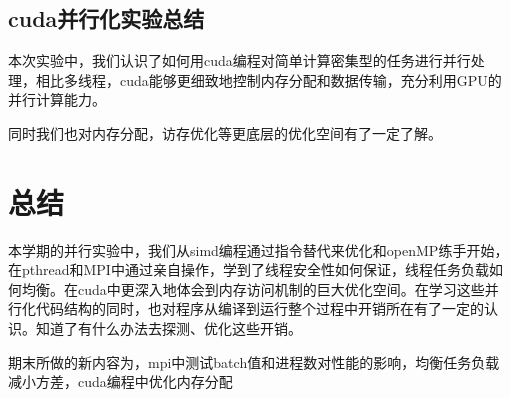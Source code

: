 \documentclass[a4paper]{article}
\begin{document}
\subsection{cuda并行化实验总结}
\par 本次实验中，我们认识了如何用cuda编程对简单计算密集型的任务进行并行处理，相比多线程，cuda能够更细致地控制内存分配和数据传输，充分利用GPU的并行计算能力。
\par 同时我们也对内存分配，访存优化等更底层的优化空间有了一定了解。
\section{总结}
\par 本学期的并行实验中，我们从simd编程通过指令替代来优化和openMP练手开始，在pthread和MPI中通过亲自操作，学到了线程安全性如何保证，线程任务负载如何均衡。在cuda中更深入地体会到内存访问机制的巨大优化空间。在学习这些并行化代码结构的同时，也对程序从编译到运行整个过程中开销所在有了一定的认识。知道了有什么办法去探测、优化这些开销。
\par 期末所做的新内容为，mpi中测试batch值和进程数对性能的影响，均衡任务负载减小方差，cuda编程中优化内存分配
\end{document}
